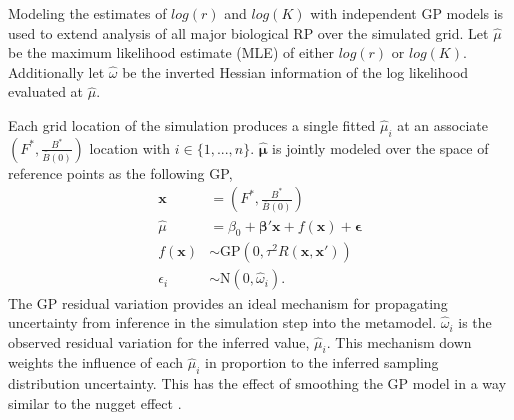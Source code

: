 \documentclass[12pt]{article}
\begin{document}
Modeling the estimates of $log(r)$ and $log(K)$ with independent GP models is 
used to extend analysis of all major biological RP over the simulated grid. 
Let $\hat\mu$ be the maximum likelihood estimate (MLE) of either $log(r)$ or 
$log(K)$. Additionally let $\hat\omega$ be the inverted Hessian information of 
the log likelihood evaluated at $\hat\mu$. 

%
Each grid location of the simulation produces a single fitted $\hat\mu_i$ at an
associate $\left(F^*, \frac{B^*}{\bar B(0)}\right)$ location with 
$i\in\{1,...,n\}$. $\bm{\hat\mu}$ is jointly modeled over the space of 
reference points as the following GP,
\begin{align}   \label{gpModel}
        \bm{x} &= \left(F^*, \frac{B^*}{\bar B(0)}\right) \nonumber\\
        \hat\mu &= \beta_0 + \bm{\beta}'\bm{x} + f(\bm{x}) + \bm{\epsilon} \nonumber \\
        f(\bm{x}) &\sim \text{GP}(0, \tau^2 R(\bm{x}, \bm{x'})) \nonumber \\
        \epsilon_i &\sim \text{N}(0, \hat\omega_i).
\end{align}
%
The GP residual variation provides an ideal mechanism for propagating uncertainty 
from inference in the simulation step into the metamodel. $\hat\omega_i$ is the 
observed residual variation for the inferred value, $\hat\mu_i$. This mechanism 
down weights the influence of each $\hat\mu_i$ in proportion to the inferred 
sampling distribution uncertainty. This has the effect of smoothing the GP 
model in a way similar to the nugget effect . %

\end{document}
